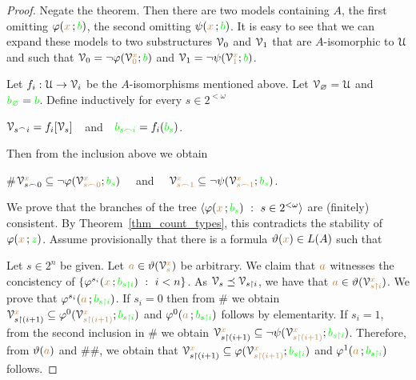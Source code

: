 \begin{proof}
  Negate the theorem. 
  Then there are two models containing $A$, the first omitting $\varphi({\color{brown} x}\,;{\color{green} b})$, the second omitting $\psi({\color{brown} x}\,;{\color{green} b})$.
  It is easy to see that we can expand these models to two substructures $\EuScript V_0$ and $\EuScript V_1$ that are $A$-isomorphic to $\EuScript U$ and such that $\EuScript V_0=\neg\varphi(\EuScript V_0^{\color{brown} x};{\color{green} b})$ and $\EuScript V_1=\neg\psi(\EuScript V_1^{\color{brown} x};{\color{green} b})$.

  Let $f_i:\EuScript U\to\EuScript V_i$ be the $A$-isomorphisms mentioned above. 
  Let $\EuScript V_\varnothing=\EuScript U$ and ${\color{green} b_\varnothing}={\color{green} b}$.
  Define inductively for every $s\in 2^{<\omega}$ 

  \hfil$\EuScript V_{s^\frown i}=f_i[\EuScript V_s]$\ \ and\ \ ${\color{green} b_{s\frown i}}=f_i({\color{green} b_s})$.

  Then from the inclusion above we obtain

  \#\hfil$\EuScript V_{s\frown0}^{{\color{brown} x}}\subseteq\neg\varphi(\EuScript V_{s\frown0}^{\color{brown} x};{\color{green} b_s})$ \ \ and \ \  $\EuScript V_{s\frown1}^{\color{brown} x}\subseteq\neg\psi(\EuScript V_{s\frown1}^{\color{brown} x};{\color{green} b_s})$.

  We prove that the branches of the tree $\<\phi({\mr x}\,;{\gr b_s})\ :\  s\in2^{<\omega}\>$ are (finitely) consistent. 
  By Theorem~\ref{thm_count_types}, this contradicts the stability of $\varphi({\color{brown} x}\,;{\color{green} z})$.
  Assume provisionally that there is a formula $\vartheta({\color{brown} x})\in L(A)$ such that
  
  
  Let $s\in2^n$ be given.
  Let ${\color{brown} a}\in\vartheta(\EuScript V_s^{\color{brown} x})$ be arbitrary. We claim that ${\color{brown} a}$ witnesses the concistency of $\{\phi^{s_i}({\mr x}\,;{\gr b_{s\restriction i}})\ :\ i<n\}$.
  As $\EuScript V_s\preceq\EuScript V_{s\restriction i}$, we have that ${\color{brown} a}\in\vartheta(\EuScript V_{s\restriction i}^{\color{brown} x})$.
  We prove that $\varphi^{s_i}({\color{brown} a}\,;{\color{green} b_{s\restriction i}})$.
  If $s_i=0$ then from \# we obtain $\EuScript V_{s\restriction(i+1)}^{{\color{brown} x}}\subseteq\varphi^0(\EuScript V_{s\restriction(i+1)}^{\color{brown} x};{\color{green} b_{s\restriction i}})$ and $\varphi^0({\color{brown} a}\,;{\color{green} b_{s\restriction i}})$ follows by elementarity.
  If $s_i=1$, from the second inclusion in \# we obtain $\EuScript V_{s\restriction(i+1)}^{{\color{brown} x}}\subseteq\neg\psi(\EuScript V_{s\restriction(i+1)}^{\color{brown} x};{\color{green} b_{s\restriction i}})$.
  Therefore, from $\vartheta({\color{brown} a})$ and \#\#, we obtain that $\EuScript V_{s\restriction(i+1)}^{{\color{brown} x}}\subseteq\varphi(\EuScript V_{s\restriction(i+1)}^{\color{brown} x};{\color{green} b_{s\restriction i}})$ and $\varphi^1({\color{brown} a}\,;{\color{green} b_{s\restriction i}})$ follows.


\end{proof}
